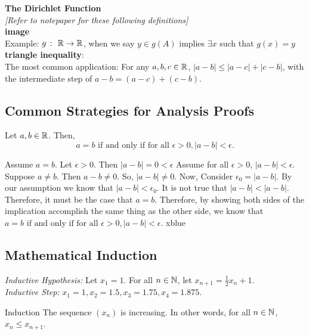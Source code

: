 \textbf{\Gls{The Dirichlet Function}} \\

\textit{[Refer to notepaper for these following definitions]} \\

\textbf{\Gls{image}} \\

Example: $g \ \colon \ \mathbb{R} \rightarrow \mathbb{R}$, when we say $y \in g(A)$ implies $\exists x$ such that $g(x) = y$ \\

\hypertarget{Triangle Inequality}{}
\textbf{\Gls{triangle inequality}}: \\
The most common application: For any $a,b,c \in \mathbb{R}$, $|a - b| \leq |a-c| + |c-b|$, with the intermediate step of $a - b = (a-c) + (c-b)$.

\subsection{Common Strategies for Analysis Proofs} \hfill

\setcounter{BoxCounter}{5}
\begin{theorem}
    Let $a,b \in \mathbb{R}$. Then, $$a = b \text{ if and only if for all } \epsilon > 0, |a-b| < \epsilon.$$
\end{theorem}

\iffpf
    {Assume $a = b$. Let $\epsilon > 0$. Then $|a-b| = 0 < \epsilon$}
    {Assume for all $\epsilon > 0$, $|a-b| < \epsilon$. Suppose $a \ne b$. Then $a - b \ne 0$. So, $|a-b| \ne 0$. Now, Consider $\epsilon_0 = |a-b|$. By our assumption we know that $|a-b| < \epsilon_0$. It is not true that $|a-b| < |a - b|$. Therefore, it must be the case that $a = b$.}
    {Therefore, by showing both sides of the implication accomplish the same thing as the other side, we know that $a = b \text{ if and only if for all } \epsilon > 0, |a-b| < \epsilon.$}
    {xblue}

\subsection{Mathematical Induction} \hfill

\textit{Inductive Hypothesis:} Let $x_1 = 1$. For all $n \in \mathbb{N}$, let $x_{n+1} = \frac{1}{2}x_n + 1$. \\

\textit{Inductive Step:} $x_1 = 1, x_2 = 1.5, x_3 = 1.75, x_4 = 1.875$. \\

\begin{example}
    {Induction} The sequence $(x_n)$ is increasing. In other words, for all $n\in \mathbb{N}$, $x_n \leq x_{n+1}$. 
\end{example}

